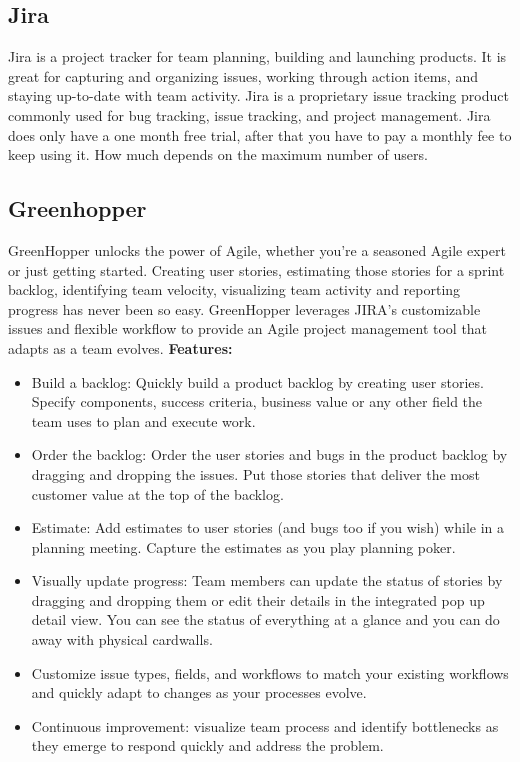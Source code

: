 \subsection{Jira}
Jira is a project tracker for team planning, building and launching products. It is great for capturing and organizing issues, working through action items, and staying up-to-date with team activity. Jira is a proprietary issue tracking product commonly used for bug tracking, issue tracking, and project management.
\newline
\newline
Jira does only have a one month free trial, after that you have to pay a monthly fee to keep using it. How much depends on the maximum number of users.

\subsection{Greenhopper}
GreenHopper unlocks the power of Agile, whether you're a seasoned Agile expert or just getting started. Creating user stories, estimating those stories for a sprint backlog, identifying team velocity, visualizing team activity and reporting progress has never been so easy.
\newline
\newline
GreenHopper leverages JIRA's customizable issues and flexible workflow to provide an Agile project management tool that adapts as a team evolves.
\newline
\newline
\textbf{Features:}
\begin{itemize}
\item{}Build a backlog: Quickly build a product backlog by creating user stories. Specify components, success criteria, business value or any other field the team uses to plan and execute work.
\item{}Order the backlog: Order the user stories and bugs in the product backlog by dragging and dropping the issues. Put those stories that deliver the most customer value at the top of the backlog.
\item{}Estimate: Add estimates to user stories (and bugs too if you wish) while in a planning meeting. Capture the estimates as you play planning poker.
\item{}Visually update progress: Team members can update the status of stories by dragging and dropping them or edit their details in the integrated pop up detail view. You can see the status of everything at a glance and you can do away with physical cardwalls.
\item{}Customize issue types, fields, and workflows to match your existing workflows and quickly adapt to changes as your processes evolve.
\item{}Continuous improvement: visualize team process and identify bottlenecks as they emerge to respond quickly and address the problem.
\end{itemize}